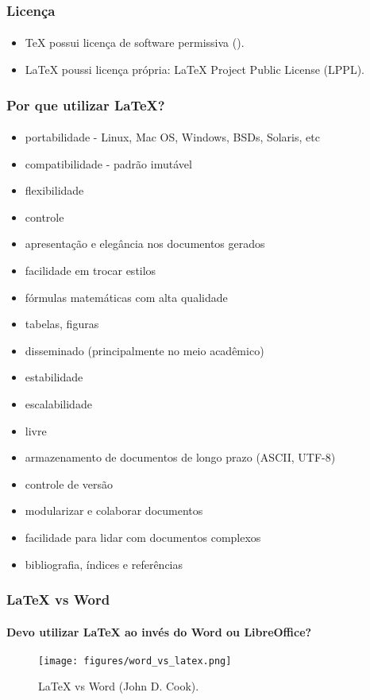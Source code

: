 \begin{frame}
\frametitle{Licença}
\framesubtitle{}
\begin{itemize}
  \item \TeX{} possui licença de software permissiva ().
  \item \LaTeX{} poussi licença própria: \LaTeX{} Project Public License (LPPL).
\end{itemize}
\end{frame}
\begin{frame}[allowframebreaks]
\frametitle{Por que utilizar \LaTeX{}?}
\framesubtitle{}
\begin{itemize}
  \item portabilidade - Linux, Mac OS, Windows, BSDs, Solaris, etc
  \item compatibilidade - padrão imutável
  \item flexibilidade
  \item controle
  \item apresentação e elegância nos documentos gerados
  \item facilidade em trocar estilos
  \item fórmulas matemáticas com alta qualidade
  \item tabelas, figuras
  \item disseminado (principalmente no meio acadêmico)
  \item estabilidade
  \item escalabilidade
  \item livre
  \item armazenamento de documentos de longo prazo (ASCII, UTF-8)
  \item controle de versão
  \item modularizar e colaborar documentos
  \item facilidade para lidar com documentos complexos
  \item bibliografia, índices e referências
\end{itemize}
\end{frame}


\begin{frame}
\frametitle{\LaTeX{} vs Word}
\framesubtitle{Devo utilizar \LaTeX{} ao invés do Word ou LibreOffice?}
  \begin{figure}[h!]
  \centering
  \texttt{[image: figures/word\_vs\_latex.png]}
  \caption{\LaTeX{} vs Word (John D. Cook).}
  \label{fig:word_vs_latex}
  \end{figure}
\end{frame}


